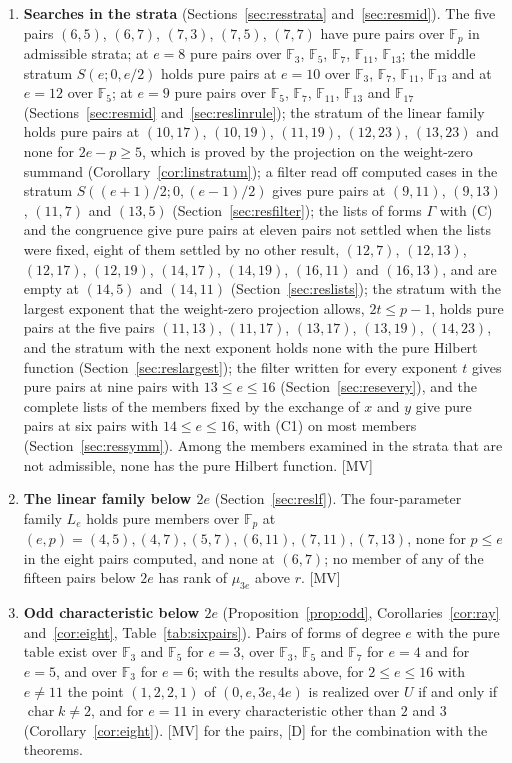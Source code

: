 \documentclass[11pt]{article}
\theoremstyle{definition}
\theoremstyle{remark}
\newcommand{\F}{\mathbb{F}}
\newcommand{\ch}{\operatorname{char}}
\begin{document}
\begin{enumerate}
\item \textbf{Searches in the strata} (Sections~\ref{sec:resstrata} and~\ref{sec:resmid}). The five pairs $(6,5)$, $(6,7)$, $(7,3)$, $(7,5)$, $(7,7)$ have pure pairs over $\F_p$ in admissible strata; at $e=8$ pure pairs over $\F_3$, $\F_5$, $\F_7$, $\F_{11}$, $\F_{13}$; the middle stratum $S(e;0,e/2)$ holds pure pairs at $e=10$ over $\F_3$, $\F_7$, $\F_{11}$, $\F_{13}$ and at $e=12$ over $\F_5$; at $e=9$ pure pairs over $\F_5$, $\F_7$, $\F_{11}$, $\F_{13}$ and $\F_{17}$ (Sections~\ref{sec:resmid} and~\ref{sec:reslinrule}); the stratum of the linear family holds pure pairs at $(10,17)$, $(10,19)$, $(11,19)$, $(12,23)$, $(13,23)$ and none for $2e-p\ge5$, which is proved by the projection on the weight-zero summand (Corollary~\ref{cor:linstratum}); a filter read off computed cases in the stratum $S((e+1)/2;0,(e-1)/2)$ gives pure pairs at $(9,11)$, $(9,13)$, $(11,7)$ and $(13,5)$ (Section~\ref{sec:resfilter}); the lists of forms $\Gamma$ with (C) and the congruence give pure pairs at eleven pairs not settled when the lists were fixed, eight of them settled by no other result, $(12,7)$, $(12,13)$, $(12,17)$, $(12,19)$, $(14,17)$, $(14,19)$, $(16,11)$ and $(16,13)$, and are empty at $(14,5)$ and $(14,11)$ (Section~\ref{sec:reslists}); the stratum with the largest exponent that the weight-zero projection allows, $2t\le p-1$, holds pure pairs at the five pairs $(11,13)$, $(11,17)$, $(13,17)$, $(13,19)$, $(14,23)$, and the stratum with the next exponent holds none with the pure Hilbert function (Section~\ref{sec:reslargest}); the filter written for every exponent $t$ gives pure pairs at nine pairs with $13\le e\le16$ (Section~\ref{sec:resevery}), and the complete lists of the members fixed by the exchange of $x$ and $y$ give pure pairs at six pairs with $14\le e\le16$, with (C1) on most members (Section~\ref{sec:ressymm}). Among the \nwcNonAdmMembers{} members examined in the \nwcNonAdm{} strata that are not admissible, none has the pure Hilbert function. [MV]
\item \textbf{The linear family below $2e$} (Section~\ref{sec:reslf}). The four-parameter family $L_e$ holds pure members over $\F_p$ at $(e,p)=(4,5),(4,7),(5,7),(6,11),(7,11),(7,13)$, none for $p\le e$ in the eight pairs computed, and none at $(6,7)$; no member of any of the fifteen pairs below $2e$ has rank of $\mu_{3e}$ above $r$. [MV]
\item \textbf{Odd characteristic below $2e$} (Proposition~\ref{prop:odd}, Corollaries~\ref{cor:ray} and~\ref{cor:eight}, Table~\ref{tab:sixpairs}). Pairs of forms of degree $e$ with the pure table exist over $\F_3$ and $\F_5$ for $e=3$, over $\F_3$, $\F_5$ and $\F_7$ for $e=4$ and for $e=5$, and over $\F_3$ for $e=6$; with the results above, for $2\le e\le16$ with $e\ne11$ the point $(1,2,2,1)$ of $(0,e,3e,4e)$ is realized over $U$ if and only if $\ch k\ne2$, and for $e=11$ in every characteristic other than $2$ and $3$ (Corollary~\ref{cor:eight}). [MV] for the pairs, [D] for the combination with the theorems.

\end{enumerate}
\end{document}
